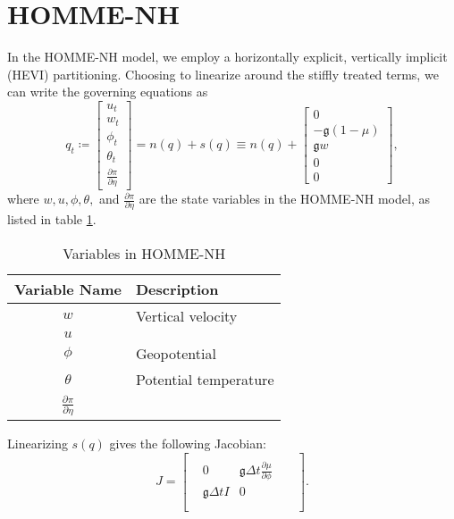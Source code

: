 \documentclass{csri19}
\newcommand{\CFKg}{\mathfrak{g}}
\begin{document}
\section{HOMME-NH}\label{CFK:sec:homme}
In the HOMME-NH model, we employ a horizontally explicit, vertically 
implicit (HEVI) partitioning. Choosing to linearize around the stiffly 
treated terms, we can write the governing equations as
\[q_t \coloneqq \begin{bmatrix} u_t \\
w_t\\
\phi_t\\
\theta_t\\
\frac{\partial \pi}{\partial \eta}
\end{bmatrix} = n(q) + s(q) \equiv n(q) + \begin{bmatrix}
0\\
-\CFKg (1-\mu)\\
\CFKg w\\
0\\
0\end{bmatrix},\] 
where $w, u,\phi, \theta,$ and $\frac{\partial \pi}{\partial \eta}$ are the
 state variables in the HOMME-NH model, as listed in table \ref{CFK:tab:variables}.

\begin{table}
  \caption{Variables in HOMME-NH}
  \label{CFK:tab:variables}
  \begin{center}
    \begin{tabular}{|c|l|}
      \hline
      \textbf{Variable Name} & \textbf{Description} \\
      \hline
      $w$ & Vertical velocity \\
      $u$ & \\
      $\phi$ & Geopotential \\
      $\theta$ & Potential temperature \\
      $\frac{\partial\pi}{\partial\eta}$ & \\
      \hline 
    \end{tabular}
  \end{center}
\end{table}

Linearizing $s(q)$ gives the following Jacobian:
\[ J = \begin{bmatrix}
 &                  &                                                   &  & \\
 & 0                & \CFKg \Delta t \frac{\partial \mu}{\partial \phi} &  & \\
 & \CFKg \Delta t I & 0                                                 &  & \\
 &                  &                                                   &  & \\
 &                  &                                                   &  & \end{bmatrix}.\]
\end{document}
